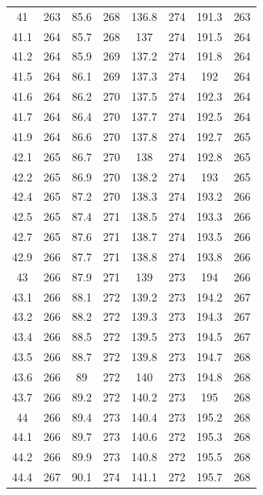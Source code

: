\documentclass[12pt]{ctexart}
\numberwithin{equation}{section}
\begin{document}
\begin{longtable}{cc|cc|cc|cc}
41  &  263  &  85.6  &  268  &  136.8  &  274  &  191.3  &  263  \\
41.1  &  264  &  85.7  &  268  &  137  &  274  &  191.5  &  264  \\
41.2  &  264  &  85.9  &  269  &  137.2  &  274  &  191.8  &  264  \\
41.5  &  264  &  86.1  &  269  &  137.3  &  274  &  192  &  264  \\
41.6  &  264  &  86.2  &  270  &  137.5  &  274  &  192.3  &  264  \\
41.7  &  264  &  86.4  &  270  &  137.7  &  274  &  192.5  &  264  \\
41.9  &  264  &  86.6  &  270  &  137.8  &  274  &  192.7  &  265  \\
42.1  &  265  &  86.7  &  270  &  138  &  274  &  192.8  &  265  \\
42.2  &  265  &  86.9  &  270  &  138.2  &  274  &  193  &  265  \\
42.4  &  265  &  87.2  &  270  &  138.3  &  274  &  193.2  &  266  \\
42.5  &  265  &  87.4  &  271  &  138.5  &  274  &  193.3  &  266  \\
42.7  &  265  &  87.6  &  271  &  138.7  &  274  &  193.5  &  266  \\
42.9  &  266  &  87.7  &  271  &  138.8  &  274  &  193.8  &  266  \\
43  &  266  &  87.9  &  271  &  139  &  273  &  194  &  266  \\
43.1  &  266  &  88.1  &  272  &  139.2  &  273  &  194.2  &  267  \\
43.2  &  266  &  88.2  &  272  &  139.3  &  273  &  194.3  &  267  \\
43.4  &  266  &  88.5  &  272  &  139.5  &  273  &  194.5  &  267  \\
43.5  &  266  &  88.7  &  272  &  139.8  &  273  &  194.7  &  268  \\
43.6  &  266  &  89  &  272  &  140  &  273  &  194.8  &  268  \\
43.7  &  266  &  89.2  &  272  &  140.2  &  273  &  195  &  268  \\
44  &  266  &  89.4  &  273  &  140.4  &  273  &  195.2  &  268  \\
44.1  &  266  &  89.7  &  273  &  140.6  &  272  &  195.3  &  268  \\
44.2  &  266  &  89.9  &  273  &  140.8  &  272  &  195.5  &  268  \\
44.4  &  267  &  90.1  &  274  &  141.1  &  272  &  195.7  &  268  \\

\end{longtable}
\end{document}
